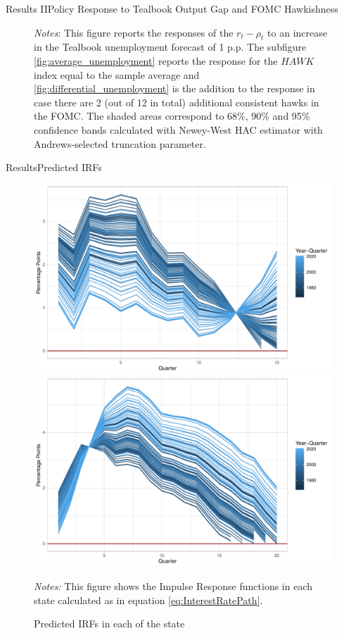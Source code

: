 \documentclass[11pt,pdf,aspectratio=129]{beamer}
\begin{document}
\begin{frame}{Results II}{Policy Response to Tealbook Output Gap and FOMC Hawkishness}
\begin{figure}[!htbp]
\begin{subfigure}[b]{0.49\textwidth}
        \end{subfigure}\vspace{-4ex}
            {\begin{flushleft}\tiny\textit{Notes}: This figure reports the responses of the $r_t-\rho_t$ to an increase in the Tealbook unemployment forecast of 1 p.p. The subfigure \ref{fig:average_unemployment} reports the response for the $\mathit{HAWK}$ index equal to the sample average and \ref{fig:differential_unemployment} is the addition to the response in case there are 2 (out of 12 in total) additional consistent hawks in the FOMC. The shaded areas correspond to 68\%, 90\% and 95\% confidence bands calculated with Newey-West HAC estimator with Andrews-selected truncation parameter.\end{flushleft}}
    \end{figure}
    
\end{frame}



\begin{frame}{Results}{Predicted IRFs}
    \begin{figure}[!htbp]\centering
        \begin{minipage}{\textwidth}
          \caption{Predicted IRFs in each of the state} 
          \label{fig:predicted_IRF}
          \includegraphics[width=0.5\linewidth]{irfs_plot_longer.pdf}%
          \includegraphics[width=0.5\linewidth]{irfs_plot_shorter.pdf}
          {\begin{flushleft}\tiny \textit{Notes:} This figure shows the Impulse Response functions in each state calculated as in equation \eqref{eq:InterestRatePath}.\end{flushleft}} 
          \end{minipage}
      \end{figure}
\end{frame}
\end{document}
